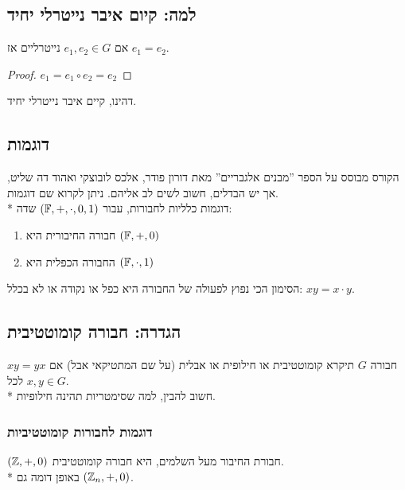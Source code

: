 \subsection{למה: קיום איבר נייטרלי יחיד}
אם $e_1, e_2 \in G$ נייטרליים אז $e_1 = e_2$.
\begin{proof}
	$e_1 = e_1 \circ e_2 = e_2$
\end{proof}
דהינו, קיים איבר נייטרלי יחיד.

\subsection{דוגמות}
הקורס מבוסס על הספר ''מבנים אלגבריים'' מאת דורון פודר, אלכס לובוצקי ואהוד דה שליט, אך יש הבדלים, חשוב לשים לב אליהם. ניתן לקרוא שם דוגמות. \\*
דוגמות כלליות לחבורות,
עבור $(\mathbb{F}, +, \cdot, 0, 1)$ שדה:
\begin{enumerate}
	\item חבורה החיבורית היא $(\mathbb{F}, +, 0)$
	\item החבורה הכפלית היא $(\mathbb{F}, \cdot, 1)$
\end{enumerate}
 הסימון הכי נפוץ לפעולה של החבורה היא כפל או נקודה או לא בכלל: $xy = x \cdot y$.

 \subsection{הגדרה: חבורה קומוטטיבית}
חבורה $G$ תיקרא קומוטטיבית או חילופית או אבלית (על שם המתטיקאי אבל) אם $xy = yx$ לכל $x, y \in G$. \\*
חשוב להבין, למה שסימטריות תהינה חילופיות.

\subsubsection{דוגמות לחבורות קומוטטיביות}
$(\mathbb{Z}, +, 0)$ חבורת החיבור מעל השלמים, היא חבורה קומוטטיבית. \\*
באופן דומה גם $(\mathbb{Z}_n, +, 0)$.


